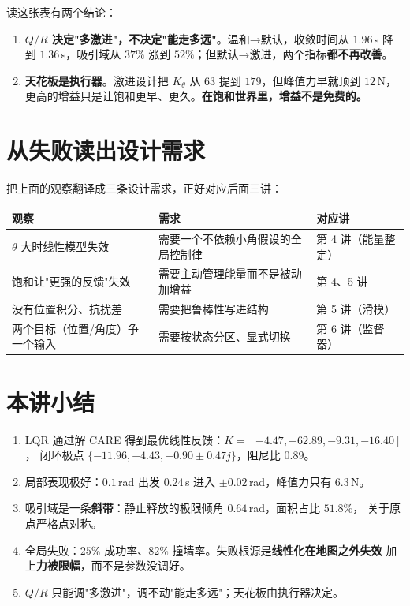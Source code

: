 读这张表有两个结论：

\begin{enumerate}[leftmargin=2em,itemsep=2pt]
  \item \textbf{$Q/R$ 决定"多激进"，不决定"能走多远"}。温和→默认，收敛时间从 $1.96$\,s
        降到 $1.36$\,s，吸引域从 $37\%$ 涨到 $52\%$；但默认→激进，两个指标\textbf{都不再改善}。
  \item \textbf{天花板是执行器}。激进设计把 $K_\theta$ 从 $63$ 提到 $179$，但峰值力早就顶到 $12$\,N，
        更高的增益只是让饱和更早、更久。\textbf{在饱和世界里，增益不是免费的。}
\end{enumerate}


\section{从失败读出设计需求}

把上面的观察翻译成三条设计需求，正好对应后面三讲：

\begin{center}
\small
\begin{tabular}{@{}lp{4.4cm}p{4.4cm}@{}}
\toprule
观察 & 需求 & 对应讲 \\
\midrule
$\theta$ 大时线性模型失效 & 需要一个不依赖小角假设的全局控制律 & 第 4 讲（能量整定）\\
饱和让"更强的反馈"失效 & 需要主动管理能量而不是被动加增益 & 第 4、5 讲 \\
没有位置积分、抗扰差 & 需要把鲁棒性写进结构 & 第 5 讲（滑模）\\
两个目标（位置/角度）争一个输入 & 需要按状态分区、显式切换 & 第 6 讲（监督器）\\
\bottomrule
\end{tabular}
\end{center}

\section{本讲小结}

\begin{enumerate}[leftmargin=2em,itemsep=2pt]
  \item LQR 通过解 CARE 得到最优线性反馈：$K=[-4.47,-62.89,-9.31,-16.40]$，
        闭环极点 $\{-11.96,-4.43,-0.90\pm0.47j\}$，阻尼比 $0.89$。
  \item 局部表现极好：$0.1$\,rad 出发 $0.24$\,s 进入 $\pm0.02$\,rad，峰值力只有 $6.3$\,N。
  \item 吸引域是一条\textbf{斜带}：静止释放的极限倾角 $0.64$\,rad，面积占比 $51.8\%$，
        关于原点严格点对称。
  \item 全局失败：$25\%$ 成功率、$82\%$ 撞墙率。失败根源是\textbf{线性化在地图之外失效}
        加上\textbf{力被限幅}，而不是参数没调好。
  \item $Q/R$ 只能调"多激进"，调不动"能走多远"；天花板由执行器决定。
\end{enumerate}

